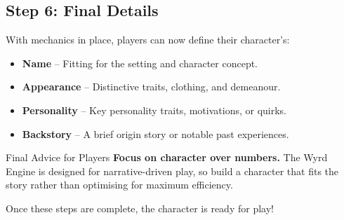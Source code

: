 \subsection{Step 6: Final Details}

With mechanics in place, players can now define their character’s:
\begin{itemize}
    \item \textbf{Name} – Fitting for the setting and character concept.
    \item \textbf{Appearance} – Distinctive traits, clothing, and demeanour.
    \item \textbf{Personality} – Key personality traits, motivations, or quirks.
    \item \textbf{Backstory} – A brief origin story or notable past experiences.
\end{itemize}

\begin{DndComment}{Final Advice for Players}
\textbf{Focus on character over numbers.} The Wyrd Engine is designed for narrative-driven play, so build a character that fits the story rather than optimising for maximum efficiency.
\end{DndComment}

Once these steps are complete, the character is ready for play!




